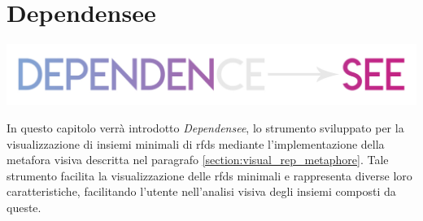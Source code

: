 \chapter{Dependensee}
\label{cap5:dependensee}
\begin{center}
    \includegraphics[width=.5\columnwidth]{capitoli/figure/logo_dependensee}
\end{center}

In questo capitolo verr\`{a} introdotto \textit{Dependensee}, lo strumento sviluppato per la visualizzazione di insiemi minimali di \acrfull{rfds} mediante l'implementazione della metafora visiva descritta nel paragrafo \ref{section:visual_rep_metaphore}. Tale strumento facilita la visualizzazione delle \acrfull{rfds} minimali e rappresenta diverse loro caratteristiche, facilitando l'utente nell'analisi visiva degli insiemi composti da queste.

